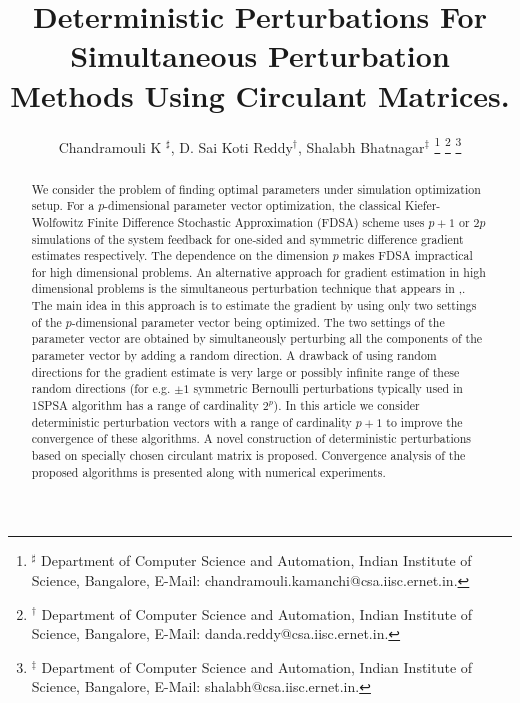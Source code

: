 \documentclass[letterpaper, 10 pt, conference]{ieeeconf}  %
\title{\LARGE \bf
 Deterministic Perturbations For Simultaneous Perturbation Methods Using
 Circulant Matrices.
}
\author{Chandramouli K $^\sharp$, D. Sai Koti Reddy$^\dagger$, Shalabh Bhatnagar$^\ddag$
\thanks{
$^\sharp$ Department of Computer Science and Automation,
Indian Institute of Science, Bangalore,
E-Mail: chandramouli.kamanchi@csa.iisc.ernet.in.}
\thanks{
$^\dagger$ Department of Computer Science and Automation,
Indian Institute of Science, Bangalore,
E-Mail: danda.reddy@csa.iisc.ernet.in.}
\thanks{$^\ddag$ Department of Computer Science and Automation,
Indian Institute of Science, Bangalore,
E-Mail: shalabh@csa.iisc.ernet.in.}
}
\begin{document}
% 
% 
\maketitle
% 
% 
\begin{abstract}
We consider the problem of finding optimal parameters under simulation optimization setup.
For a $p$-dimensional parameter 
vector optimization, the classical Kiefer-Wolfowitz Finite Difference Stochastic 
Approximation (FDSA) scheme uses $p+1$ or $2p$ simulations of the system feedback for one-sided and symmetric difference gradient estimates respectively.
The dependence on the dimension $p$ makes FDSA impractical for high dimensional problems.
An alternative approach for gradient estimation in high dimensional problems is the 
simultaneous perturbation technique that appears in \cite{spall},\cite{kushcla}.
The main idea in this approach is to estimate the gradient by using only two settings of 
the $p$-dimensional parameter vector being optimized. 
The two settings of the parameter vector are obtained by
simultaneously perturbing all the components of the parameter vector by adding a random 
direction. A drawback of using random directions for the gradient estimate is very large
or possibly infinite range of these random directions (for e.g. $\pm 1$ symmetric 
Bernoulli perturbations typically used in 1SPSA algorithm has a range of cardinality $2^p$).
In this article we consider deterministic perturbation vectors with a range of cardinality
$p+1$ to improve the convergence of these algorithms. A novel construction of deterministic perturbations 
based on specially chosen circulant matrix is proposed. Convergence analysis of the proposed
algorithms is presented along with numerical experiments. 
\end{abstract}
\end{document}
